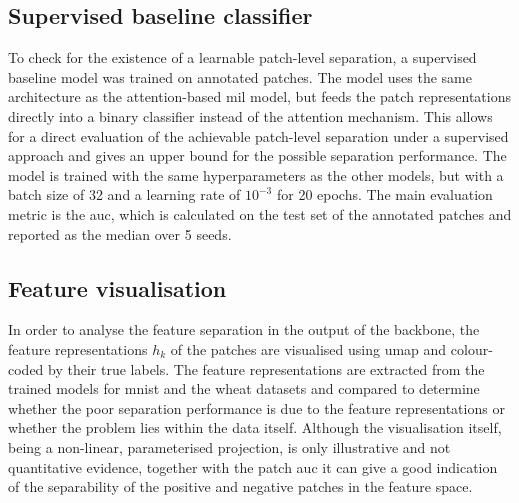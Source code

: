 \documentclass[12pt,parskip = half, DIV=classic,listof=totoc]{scrartcl}
\begin{document}
		\subsection{Supervised baseline classifier}\label{sec:method_baseline}
			To check for the existence of a learnable patch-level separation, a supervised baseline model was trained on annotated patches.
			The model uses the same architecture as the attention-based \ac{mil} model, but feeds the patch representations directly into a binary 
			classifier instead of the attention mechanism. This allows for a direct evaluation of the achievable patch-level
			separation under a supervised approach and gives an upper bound for the possible separation performance.
			The model is trained with the same hyperparameters as the other models, but with a batch size of 32 and a learning rate of $10^{-3}$ for 20 epochs. 
			The main evaluation metric is the \ac{auc}, which is calculated on the test set of the annotated patches and reported as the median over 5 seeds. 
		
		\subsection{Feature visualisation}\label{sec:UMAP}
			In order to analyse the feature separation in the output of the backbone, the feature representations $h_k$ of the patches are
			visualised using \ac{umap} \cite{mcinnesUMAPUniformManifold2020} and colour-coded by their true labels. The feature representations are extracted 
			from the trained models for \ac{mnist} and the wheat datasets and compared to determine whether the poor separation performance is due to the feature representations 
			or whether the problem lies within the data itself. Although the visualisation itself, being a non-linear, parameterised projection, is only illustrative
			and not quantitative evidence, together with the patch \ac{auc} it can give a good indication of the separability of the positive and negative 
			patches in the feature space.
\end{document}
